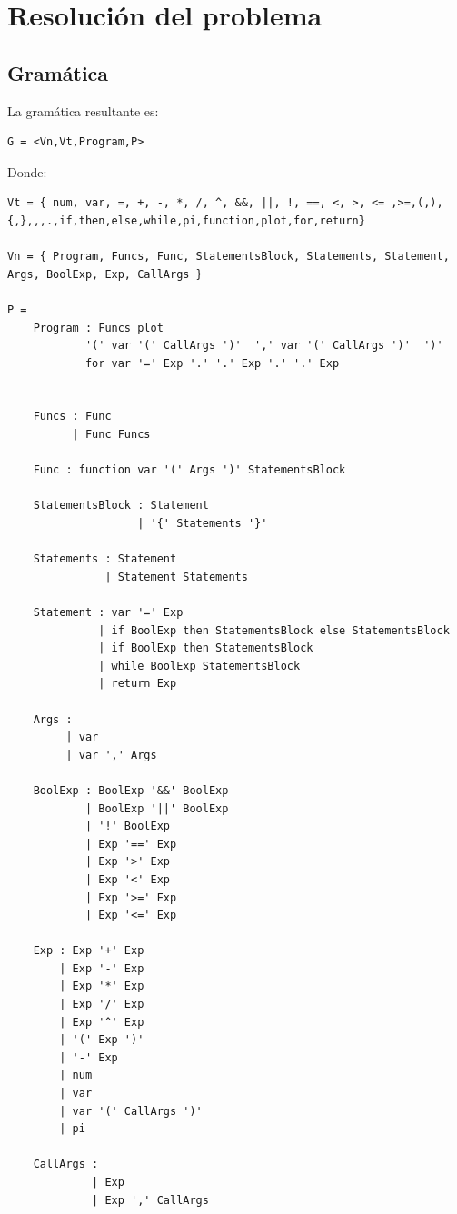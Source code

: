 \section{Resoluci\'on del problema}

\subsection{Gram\'atica}

La gram\'atica resultante es: 

\begin{verbatim}
G = <Vn,Vt,Program,P>
\end{verbatim}

Donde:
\begin{verbatim}
Vt = { num, var, =, +, -, *, /, ^, &&, ||, !, ==, <, >, <= ,>=,(,),
{,},,,.,if,then,else,while,pi,function,plot,for,return} 

Vn = { Program, Funcs, Func, StatementsBlock, Statements, Statement, 
Args, BoolExp, Exp, CallArgs }

P = 
    Program : Funcs plot
            '(' var '(' CallArgs ')'  ',' var '(' CallArgs ')'  ')'
            for var '=' Exp '.' '.' Exp '.' '.' Exp
                

    Funcs : Func                 
          | Func Funcs           
    
    Func : function var '(' Args ')' StatementsBlock 
    
    StatementsBlock : Statement  
                    | '{' Statements '}'
    
    Statements : Statement       
               | Statement Statements 
    
    Statement : var '=' Exp      
              | if BoolExp then StatementsBlock else StatementsBlock 
              | if BoolExp then StatementsBlock 
              | while BoolExp StatementsBlock 
              | return Exp       
    
    Args :                       
         | var                   
         | var ',' Args          
    
    BoolExp : BoolExp '&&' BoolExp 
            | BoolExp '||' BoolExp 
            | '!' BoolExp        
            | Exp '==' Exp       
            | Exp '>' Exp        
            | Exp '<' Exp        
            | Exp '>=' Exp       
            | Exp '<=' Exp       
    
    Exp : Exp '+' Exp            
        | Exp '-' Exp            
        | Exp '*' Exp            
        | Exp '/' Exp            
        | Exp '^' Exp            
        | '(' Exp ')'            
        | '-' Exp
        | num                    
        | var                    
        | var '(' CallArgs ')'   
        | pi                     
    
    CallArgs :                   
             | Exp               
             | Exp ',' CallArgs  
\end{verbatim}



